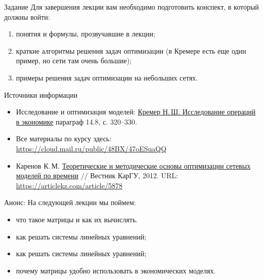 \documentclass[unicode,11pt,notheorems]{beamer}
\begin{document}
\begin{frame}{Задание}
Для завершения лекции вам необходимо подготовить конспект, в который должны войти:
	\begin{enumerate}
		\item 
			понятия и формулы, прозвучавшие в лекции;
		\item 
			краткие алгоритмы решения задач оптимизации (в Кремере есть еще один пример, но сети там очень большие);
		\item 
			примеры решения задач оптимизации на небольших сетях.
	\end{enumerate}


\end{frame}
\begin{frame}{Источники информации}
\begin{itemize}
\item 
	Исследование и оптимизация моделей:  {\color{blue}\href{https://cloud.mail.ru/public/4SN3/2MJYgEz95}{Кремер  Н.\,Ш. Исследование операций в экономике}} параграф 14.8, с. 320--330.
\item 
	Все материалы по курсу здесь:
{\color{blue}\url{https://cloud.mail.ru/public/48BX/47oESuaQQ}}

\item 
	Каренов  К.\,М. {\color{blue}\href{https://articlekz.com/article/5878}{Теоретические и методические основы оптимизации сетевых моделей по времени}} // Вестник КарГУ, 2012. URL: 
	{\color{blue}\url{https://articlekz.com/article/5878}}
\end{itemize}

\end{frame}

\begin{frame}{Анонс:}
	На следующей лекции мы поймем:
	\begin{itemize}
	\item 
		что такое матрицы и как их вычислять.
	\item 
		как решать системы линейных уравнений;
	\item 
		как решать системы линейных уравнений;
	\item 
		почему матрицы удобно использовать в экономических моделях.

	\end{itemize}

\end{frame}
\end{document}
